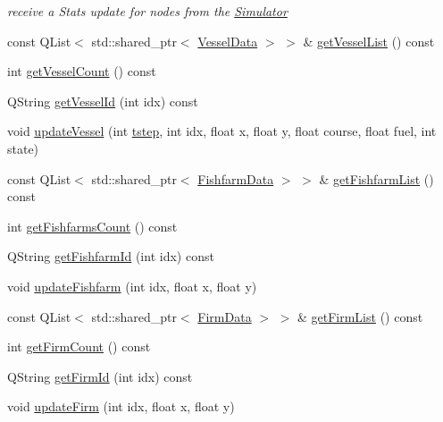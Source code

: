 \begin{DoxyCompactItemize}
\begin{DoxyCompactList}\small\item\em receive a Stats update for nodes from the \mbox{\hyperlink{class_simulator}{Simulator}} \end{DoxyCompactList}\item 
const Q\+List$<$ std\+::shared\+\_\+ptr$<$ \mbox{\hyperlink{class_vessel_data}{Vessel\+Data}} $>$ $>$ \& \mbox{\hyperlink{class_displace_model_af8426325d55bcb902b846daa70a51b88}{get\+Vessel\+List}} () const
\item 
int \mbox{\hyperlink{class_displace_model_a79aaf276ecb1a68c4670d206d9d29dac}{get\+Vessel\+Count}} () const
\item 
Q\+String \mbox{\hyperlink{class_displace_model_ad198a7c68478bc641a267060edbcd8cd}{get\+Vessel\+Id}} (int idx) const
\item 
void \mbox{\hyperlink{class_displace_model_a673f57c5da772f20f1c24d673e472e5e}{update\+Vessel}} (int \mbox{\hyperlink{thread__vessels_8cpp_a84bc73d278de929ec9974e1a95d9b23a}{tstep}}, int idx, float x, float y, float course, float fuel, int state)
\item 
const Q\+List$<$ std\+::shared\+\_\+ptr$<$ \mbox{\hyperlink{class_fishfarm_data}{Fishfarm\+Data}} $>$ $>$ \& \mbox{\hyperlink{class_displace_model_ac1186afca8297e1249cd1702a29c1083}{get\+Fishfarm\+List}} () const
\item 
int \mbox{\hyperlink{class_displace_model_af52022feb8f8904f7686fe6e82a95718}{get\+Fishfarms\+Count}} () const
\item 
Q\+String \mbox{\hyperlink{class_displace_model_a09b7493d00fbdac768445bb92fd9c319}{get\+Fishfarm\+Id}} (int idx) const
\item 
void \mbox{\hyperlink{class_displace_model_a9e7123ced28762b4e26c3ab638f8e540}{update\+Fishfarm}} (int idx, float x, float y)
\item 
const Q\+List$<$ std\+::shared\+\_\+ptr$<$ \mbox{\hyperlink{class_firm_data}{Firm\+Data}} $>$ $>$ \& \mbox{\hyperlink{class_displace_model_ae705b1df36398cdefddb94e10dafea2a}{get\+Firm\+List}} () const
\item 
int \mbox{\hyperlink{class_displace_model_af08856d5233fb20382e9efc821d33813}{get\+Firm\+Count}} () const
\item 
Q\+String \mbox{\hyperlink{class_displace_model_a23b591cdb50739ff278e1ccfafe7424c}{get\+Firm\+Id}} (int idx) const
\item 
void \mbox{\hyperlink{class_displace_model_a7e6584f26267492c117bd87101bafd8f}{update\+Firm}} (int idx, float x, float y)

\end{DoxyCompactItemize}
